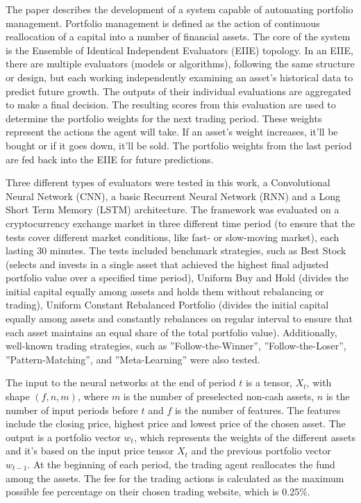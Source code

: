 \documentclass[a4paper,oneside,onecolumn,12pt]{book}
\begin{document}
	The paper describes the development of a system capable of automating portfolio management. Portfolio management is defined as the action of continuous reallocation of a capital into a number of financial assets. The core of the system is the Ensemble of Identical Independent Evaluators (EIIE) topology.  In an EIIE, there are multiple evaluators (models or algorithms), following the same structure or design, but each working independently examining an asset's historical data to predict future growth. The outputs of their individual evaluations are aggregated to make a final decision. The resulting scores from this evaluation are used to determine the portfolio weights for the next trading period. These weights represent the actions the agent will take. If an asset's weight increases, it'll be bought or if it goes down, it'll be sold. The portfolio weights from the last period are fed back into the EIIE for future predictions.

	Three different types of evaluators were tested in this work, a Convolutional Neural Network (CNN), a basic Recurrent Neural Network (RNN) and a Long Short Term Memory (LSTM) architecture. The framework was evaluated on a cryptocurrency exchange market in three different time period (to ensure that the tests cover different market conditions, like fast- or slow-moving market), each lasting 30 minutes. The tests included benchmark strategies, such as Best Stock (selects and invests in a single asset that achieved the highest final adjusted portfolio value over a specified time period), Uniform Buy and Hold (divides the initial capital equally among assets and holds them without rebalancing or trading), Uniform Constant Rebalanced Portfolio (divides the initial capital equally among assets and constantly rebalances on regular interval to ensure that each asset maintains an equal share of the total portfolio value). Additionally, well-known trading strategies, such as ”Follow-the-Winner”, ”Follow-the-Loser”, ”Pattern-Matching”, and ”Meta-Learning” were also tested.

	The input to the neural networks at the end of period $t$ is a tensor, $X_t$, with shape $(f,n,m)$, where $m$ is the number of preselected non-cash assets, $n$ is the number of input periods before $t$ and $f$ is the number of features. The features include the closing price, highest price and lowest price of the chosen asset. The output is a portfolio vector $w_t$, which represents the weights of the different assets and it's based on the input price tensor $X_t$ and the previous portfolio vector $w_{t-1}$. At the beginning of each period, the trading agent reallocates the fund among the assets. The fee for the trading actions is calculated as the maximum possible fee percentage on their chosen trading website, which is 0.25\%. 
\end{document}
